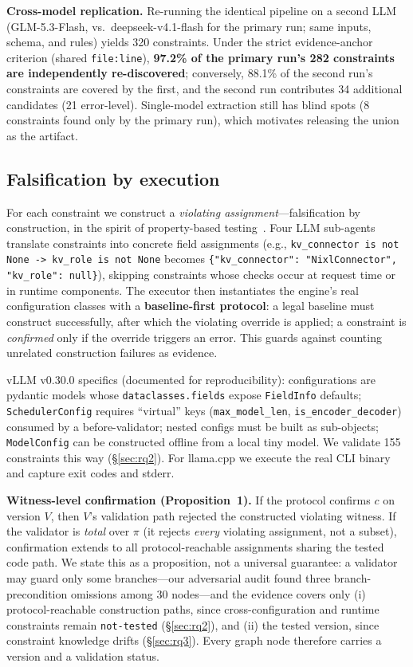\documentclass[journal]{IEEEtran}
\newcommand{\code}[1]{\texttt{#1}}
\begin{document}
\textbf{Cross-model replication.} Re-running the identical pipeline on a second LLM (GLM-5.3-Flash, vs.\ deepseek-v4.1-flash for the primary run; same inputs, schema, and rules) yields 320 constraints. Under the strict evidence-anchor criterion (shared \code{file:line}), \textbf{97.2\% of the primary run's 282 constraints are independently re-discovered}; conversely, 88.1\% of the second run's constraints are covered by the first, and the second run contributes 34 additional candidates (21 error-level). Single-model extraction still has blind spots (8 constraints found only by the primary run), which motivates releasing the union as the artifact.

\subsection{Falsification by execution}

For each constraint we construct a \emph{violating assignment}---falsification by construction, in the spirit of property-based testing~\cite{quickcheck}. Four LLM sub-agents translate constraints into concrete field assignments (e.g., \code{kv\_connector is not None -> kv\_role is not None} becomes \code{\{"kv\_connector": "NixlConnector", "kv\_role": null\}}), skipping constraints whose checks occur at request time or in runtime components. The executor then instantiates the engine's real configuration classes with a \textbf{baseline-first protocol}: a legal baseline must construct successfully, after which the violating override is applied; a constraint is \emph{confirmed} only if the override triggers an error. This guards against counting unrelated construction failures as evidence.

vLLM v0.30.0 specifics (documented for reproducibility): configurations are pydantic models whose \code{dataclasses.fields} expose \code{FieldInfo} defaults; \code{SchedulerConfig} requires ``virtual'' keys (\code{max\_model\_len}, \code{is\_encoder\_decoder}) consumed by a before-validator; nested configs must be built as sub-objects; \code{ModelConfig} can be constructed offline from a local tiny model. We validate 155 constraints this way (\S\ref{sec:rq2}). For llama.cpp we execute the real CLI binary and capture exit codes and stderr.

\textbf{Witness-level confirmation (Proposition~1).} If the protocol confirms $c$ on version $V$, then $V$'s validation path rejected the constructed violating witness. If the validator is \emph{total} over $\pi$ (it rejects \emph{every} violating assignment, not a subset), confirmation extends to all protocol-reachable assignments sharing the tested code path. We state this as a proposition, not a universal guarantee: a validator may guard only some branches---our adversarial audit found three branch-precondition omissions among 30 nodes---and the evidence covers only (i) protocol-reachable construction paths, since cross-configuration and runtime constraints remain \code{not-tested} (\S\ref{sec:rq2}), and (ii) the tested version, since constraint knowledge drifts (\S\ref{sec:rq3}). Every graph node therefore carries a version and a validation status.
\end{document}
